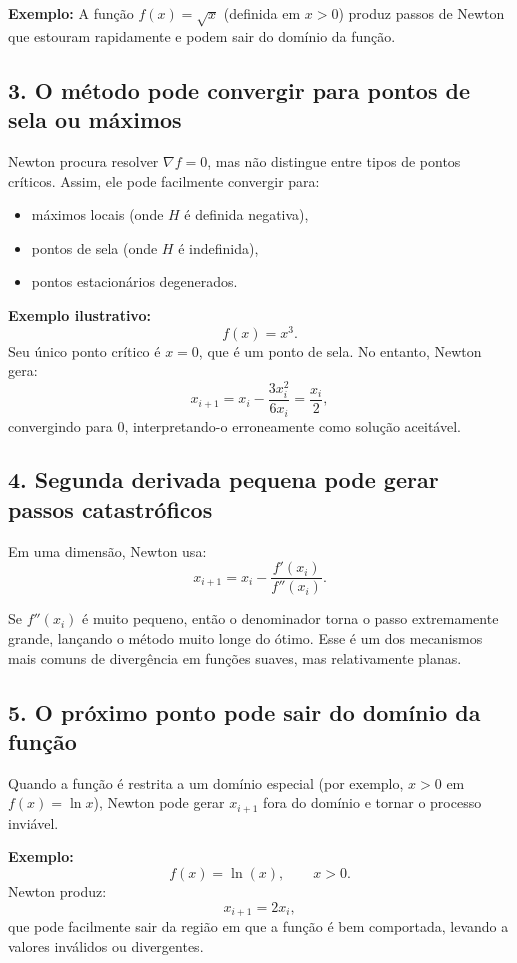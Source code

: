 \documentclass[9pt,a4paper]{extarticle}
\begin{document}
\noindent
\textbf{Exemplo:} A função $f(x)=\sqrt{x}$ (definida em $x>0$) produz passos de Newton 
que estouram rapidamente e podem sair do domínio da função.

\subsection*{3. O método pode convergir para pontos de sela ou máximos}

Newton procura resolver $\nabla f = 0$, mas não distingue entre tipos de pontos
críticos. Assim, ele pode facilmente convergir para:

\begin{itemize}
    \item máximos locais (onde $H$ é definida negativa),
    \item pontos de sela (onde $H$ é indefinida),
    \item pontos estacionários degenerados.
\end{itemize}

\noindent
\textbf{Exemplo ilustrativo:}  
\[
f(x) = x^3.
\]
Seu único ponto crítico é $x=0$, que é um ponto de sela. No entanto, Newton gera:
\[
x_{i+1} = x_i - \frac{3x_i^2}{6x_i} = \frac{x_i}{2},
\]
convergindo para $0$, interpretando-o erroneamente como solução aceitável.

\subsection*{4. Segunda derivada pequena pode gerar passos catastróficos}

Em uma dimensão, Newton usa:
\[
x_{i+1} = x_i - \frac{f'(x_i)}{f''(x_i)}.
\]

Se $f''(x_i)$ é muito pequeno, então o denominador torna o passo extremamente 
grande, lançando o método muito longe do ótimo. Esse é um dos mecanismos mais 
comuns de divergência em funções suaves, mas relativamente planas.

\subsection*{5. O próximo ponto pode sair do domínio da função}

Quando a função é restrita a um domínio especial (por exemplo, $x>0$ em 
$f(x)=\ln x$), Newton pode gerar $x_{i+1}$ fora do domínio e tornar o processo 
inviável.

\noindent
\textbf{Exemplo:}
\[
f(x) = \ln(x), \qquad x > 0.
\]
Newton produz:
\[
x_{i+1} = 2x_i,
\]
que pode facilmente sair da região em que a função é bem comportada, levando a 
valores inválidos ou divergentes.
\end{document}
